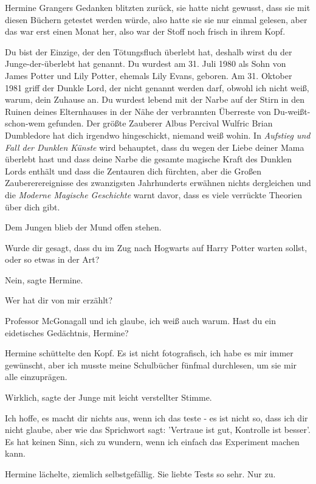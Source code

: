 Hermine Grangers Gedanken blitzten zurück, sie hatte nicht gewusst, dass sie mit
diesen Büchern getestet werden würde, also hatte sie sie nur einmal gelesen,
aber das war erst einen Monat her, also war der Stoff noch frisch in ihrem Kopf.

\glqq{}Du bist der Einzige, der den Tötungsfluch überlebt hat, deshalb wirst du
der Junge-der-überlebt hat genannt. Du wurdest am 31. Juli 1980 als Sohn von
James Potter und Lily Potter, ehemals Lily Evans, geboren. Am 31. Oktober 1981
griff der Dunkle Lord, der nicht genannt werden darf, obwohl ich nicht weiß,
warum, dein Zuhause an. Du wurdest lebend mit der Narbe auf der Stirn in den
Ruinen deines Elternhauses in der Nähe der verbrannten Überreste von
Du-weißt-schon-wem gefunden. Der größte Zauberer Albus Percival Wulfric Brian
Dumbledore hat dich irgendwo hingeschickt, niemand weiß wohin. In \emph{Aufstieg
und Fall der Dunklen Künste} wird behauptet, dass du wegen der Liebe deiner
Mama überlebt hast und dass deine Narbe die gesamte magische Kraft des Dunklen
Lords enthält und dass die Zentauren dich fürchten, aber die Großen
Zaubererereignisse des zwanzigsten Jahrhunderts erwähnen nichts dergleichen und
die \emph{Moderne Magische Geschichte} warnt davor, dass es viele verrückte
Theorien über dich gibt.\grqq{}

Dem Jungen blieb der Mund offen stehen.

\glqq{}Wurde dir gesagt, dass du im Zug nach Hogwarts auf Harry Potter warten
sollst, oder so etwas in der Art?\grqq{}

\glqq{}Nein\grqq{}, sagte Hermine.

\glqq{}Wer hat dir von mir erzählt?\grqq{}

\glqq{}Professor McGonagall und ich glaube, ich weiß auch warum. Hast du ein
eidetisches Gedächtnis, Hermine?\grqq{}

Hermine schüttelte den Kopf. \glqq{}Es ist nicht fotografisch, ich habe es mir
immer gewünscht, aber ich musste meine Schulbücher fünfmal durchlesen, um sie
mir alle einzuprägen.\grqq{}

\glqq{}Wirklich\grqq{}, sagte der Junge mit leicht verstellter Stimme.

\glqq{}Ich hoffe, es macht dir nichts aus, wenn ich das teste - es ist nicht so,
dass ich dir nicht glaube, aber wie das Sprichwort sagt: 'Vertraue ist gut,
Kontrolle ist besser'. Es hat keinen Sinn, sich zu wundern, wenn ich einfach das
Experiment machen kann.\grqq{}

Hermine lächelte, ziemlich selbstgefällig. Sie liebte Tests so sehr. \glqq{}Nur
zu.\grqq{}

